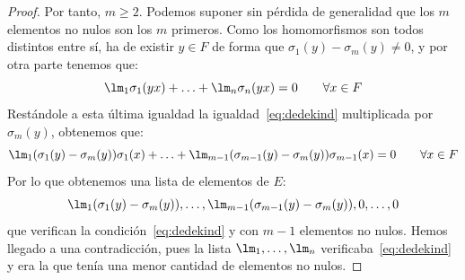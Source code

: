 \begin{lema}
\begin{proof}
        Por tanto, $m\geq 2$. Podemos suponer sin pérdida de generalidad que los $m$ elementos no nulos son los $m$ primeros. Como los homomorfismos son todos distintos entre sí, ha de existir $y\in F$ de forma que $\sigma_1(y)-\sigma_m(y)\neq 0$, y por otra parte tenemos que:
        \begin{equation*}
            \lm_1\sigma_1(yx) + \ldots + \lm_n\sigma_n(yx) = 0 \qquad \forall x\in F
        \end{equation*}
        Restándole a esta última igualdad la igualdad~\eqref{eq:dedekind} multiplicada por $\sigma_m(y)$, obtenemos que:
        \begin{equation*}
            \lm_1(\sigma_1(y) - \sigma_m(y))\sigma_1(x) + \ldots + \lm_{m-1}(\sigma_{m-1}(y)-\sigma_m(y))\sigma_{m-1}(x) = 0 \qquad \forall x\in F
        \end{equation*}
        Por lo que obtenemos una lista de elementos de $E$:
        \begin{equation*}
            \lm_1(\sigma_1(y)-\sigma_m(y)),\ldots,\lm_{m-1}(\sigma_{m-1}(y)-\sigma_m(y)),0,\ldots,0
        \end{equation*}
        que verifican la condición~\eqref{eq:dedekind} y con $m-1$ elementos no nulos. Hemos llegado a una contradicción, pues la lista $\lm_1,\ldots,\lm_n$ verificaba~\eqref{eq:dedekind} y era la que tenía una menor cantidad de elementos no nulos.
    \end{proof}
\end{lema}

